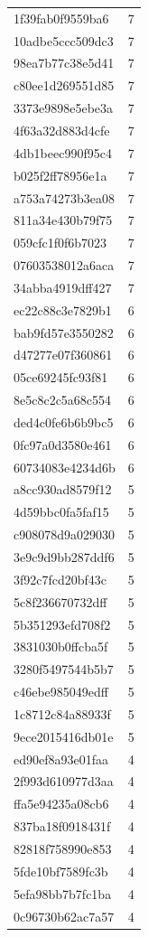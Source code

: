 \begin{tabular}{ll}
1f39fab0f9559ba6 & 7 \\
10adbe5ccc509dc3 & 7 \\
98ea7b77c38e5d41 & 7 \\
c80ee1d269551d85 & 7 \\
3373e9898e5ebe3a & 7 \\
4f63a32d883d4cfe & 7 \\
4db1beec990f95c4 & 7 \\
b025f2ff78956e1a & 7 \\
a753a74273b3ea08 & 7 \\
811a34e430b79f75 & 7 \\
059cfc1f0f6b7023 & 7 \\
07603538012a6aca & 7 \\
34abba4919dff427 & 7 \\
ec22c88c3e7829b1 & 6 \\
bab9fd57e3550282 & 6 \\
d47277e07f360861 & 6 \\
05ce69245fc93f81 & 6 \\
8e5c8c2c5a68c554 & 6 \\
ded4c0fe6b6b9bc5 & 6 \\
0fc97a0d3580e461 & 6 \\
60734083e4234d6b & 6 \\
a8cc930ad8579f12 & 5 \\
4d59bbc0fa5faf15 & 5 \\
c908078d9a029030 & 5 \\
3e9c9d9bb287ddf6 & 5 \\
3f92c7fcd20bf43c & 5 \\
5c8f236670732dff & 5 \\
5b351293efd708f2 & 5 \\
3831030b0ffcba5f & 5 \\
3280f5497544b5b7 & 5 \\
c46ebe985049edff & 5 \\
1c8712c84a88933f & 5 \\
9ece2015416db01e & 5 \\
ed90ef8a93e01faa & 4 \\
2f993d610977d3aa & 4 \\
ffa5e94235a08cb6 & 4 \\
837ba18f0918431f & 4 \\
82818f758990e853 & 4 \\
5fde10bf7589fc3b & 4 \\
5efa98bb7b7fc1ba & 4 \\
0c96730b62ac7a57 & 4 \\
\bottomrule
\end{tabular}